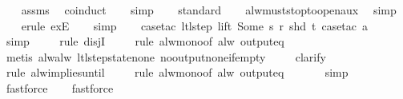 \begin{isabellebody}
{}%
%
\isadelimproof
\ \ %
\endisadelimproof
%
\isatagproof
{}\isamarkupfalse%
\ assms\ \isamarkupfalse%
\ coinduct\isanewline
\ \ \isamarkupfalse%
\ simp\isanewline
\ \ \isamarkupfalse%
\ standard\isanewline
\ \ \isamarkupfalse%
\ alw{\isacharunderscore}must{\isacharunderscore}stop{\isacharunderscore}to{\isacharunderscore}open{\isacharunderscore}aux\ \isamarkupfalse%
\ simp\isanewline
\ \ \isamarkupfalse%
\ {\isacharparenleft}erule\ exE{\isacharparenright}{\isacharplus}\isanewline
\ \ \isamarkupfalse%
\ simp\isanewline
\ \ \isamarkupfalse%
\ {\isacharparenleft}case{\isacharunderscore}tac\ {\isachardoublequoteopen}ltl{\isacharunderscore}step\ lift\ {\isacharparenleft}Some\ s{\isacharparenright}\ r\ {\isacharparenleft}shd\ t{\isacharparenright}{\isachardoublequoteclose}{\isacharcomma}\ case{\isacharunderscore}tac\ a{\isacharparenright}\isanewline
\ \ \ \isamarkupfalse%
\ simp\isanewline
\ \ \ \isamarkupfalse%
\ {\isacharparenleft}rule\ disjI{}{\isacharparenright}\isanewline
\ \ \ \isamarkupfalse%
\ {\isacharparenleft}rule\ alw{\isacharunderscore}mono{\isacharbrackleft}of\ {\isachardoublequoteopen}alw\ {\isacharparenleft}output{\isacharunderscore}eq\ {\isacharbrackleft}{\isacharbrackright}{\isacharparenright}{\isachardoublequoteclose}{\isacharbrackright}{\isacharparenright}\isanewline
\ \ \ \ \isamarkupfalse%
\ {\isacharparenleft}metis\ alw{\isacharunderscore}alw\ ltl{\isacharunderscore}step{\isacharunderscore}state{\isacharunderscore}none\ no{\isacharunderscore}output{\isacharunderscore}none{\isacharunderscore}if{\isacharunderscore}empty{\isacharparenright}\isanewline
\ \ \ \isamarkupfalse%
\ clarify\isanewline
\ \ \ \isamarkupfalse%
\ {\isacharparenleft}rule\ alw{\isacharunderscore}implies{\isacharunderscore}until{\isacharparenright}\isanewline
\ \ \ \isamarkupfalse%
\ {\isacharparenleft}rule\ alw{\isacharunderscore}mono{\isacharbrackleft}of\ {\isachardoublequoteopen}alw\ {\isacharparenleft}output{\isacharunderscore}eq\ {\isacharbrackleft}{\isacharbrackright}{\isacharparenright}{\isachardoublequoteclose}{\isacharbrackright}{\isacharparenright}\isanewline
\ \ \ \ \isamarkupfalse%
\ simp\isanewline
\ \ \ \isamarkupfalse%
\ fastforce\isanewline
\ \ \isamarkupfalse%
\ fastforce%
\endisatagproof
{\isafoldproof}%

\end{isabellebody}
